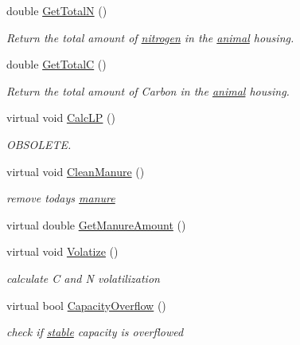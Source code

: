 \begin{DoxyCompactItemize}
double \hyperlink{classstable_aeba6a6b4fde4b262d38cedaec2f74348}{GetTotalN} ()
\begin{DoxyCompactList}\small\item\em Return the total amount of \hyperlink{classnitrogen}{nitrogen} in the \hyperlink{classanimal}{animal} housing. \item\end{DoxyCompactList}\item 
double \hyperlink{classstable_a9990239dddd0fd843bb0a7c25552292f}{GetTotalC} ()
\begin{DoxyCompactList}\small\item\em Return the total amount of Carbon in the \hyperlink{classanimal}{animal} housing. \item\end{DoxyCompactList}\item 
virtual void \hyperlink{classstable_acaf566bef659f0a671e27afa6244df4b}{CalcLP} ()
\begin{DoxyCompactList}\small\item\em OBSOLETE. \item\end{DoxyCompactList}\item 
virtual void \hyperlink{classstable_a7aa89cb458e69d9f3e4c17edbeff7b81}{CleanManure} ()
\begin{DoxyCompactList}\small\item\em remove todays \hyperlink{classmanure}{manure} \item\end{DoxyCompactList}\item 
virtual double \hyperlink{classstable_a5c7b73de0ce9ab464cd2fbc326200286}{GetManureAmount} ()
\item 
virtual void \hyperlink{classstable_ab2278527e43d05badfe1e09e619330e2}{Volatize} ()
\begin{DoxyCompactList}\small\item\em calculate C and N volatilization \item\end{DoxyCompactList}\item 
virtual bool \hyperlink{classstable_a2014aabbb54c1309c936c527f3d385e8}{CapacityOverflow} ()
\begin{DoxyCompactList}\small\item\em check if \hyperlink{classstable}{stable} capacity is overflowed \item\end{DoxyCompactList}\item 

\end{DoxyCompactItemize}
